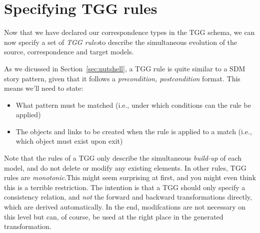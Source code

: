 \newpage
\section{Specifying TGG rules}
\genHeader

Now that we have declared our correspondence types in the TGG schema, we can now specify a set of \emph{TGG rules}to describe the simultaneous
evolution of the source, correspondence and target models.

As we dicussed in Section~\ref{sec:nutshell}, a TGG rule is quite similar to a SDM story pattern, given that it follows a \emph{precondition, postcondition}
format. This means we'll need to state:
\begin{itemize}
  \item What pattern must be matched (i.e., under which conditions can the rule be applied)
  \item The objects and links to be created when the rule is applied to a match  (i.e., which object must exist upon exit)
\end{itemize}

\vspace{0.5cm}

Note that the rules of a TGG only describe the simultaneous \emph{build-up} of each model, and do not delete or modify any existing elements. In other rules,
TGG rules are \emph{monotonic}.This might seem surprising at first, and you might even think this is a terrible restriction. The intention is
that a TGG should only specify a consistency relation, and \emph{not} the forward and backward transformations directly, which are derived automatically. In the
end, modifcations are not necessary on this level but can, of course, be used at the right place in the generated transformation.





